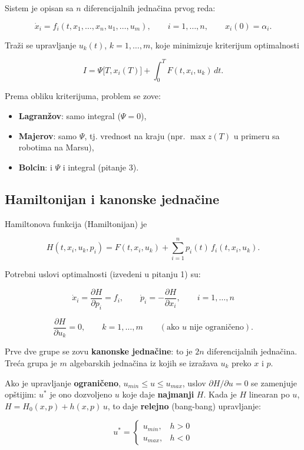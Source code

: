 \documentclass[11pt,a4paper,parskip=half,headsepline,numbers=noenddot]{scrartcl}
\begin{document}
Sistem je opisan sa \(n\) diferencijalnih jednačina prvog reda:

\[\dot x_i = f_i(t, x_1, \dots, x_n, u_1, \dots, u_m), \qquad i = 1, \dots, n, \qquad x_i(0) = \alpha_i .\]

Traži se upravljanje \(u_k(t)\), \(k = 1, \dots, m\), koje minimizuje kriterijum optimalnosti

\[I = \Psi\big[T, x_i(T)\big] + \int_0^T F(t, x_i, u_k)\,dt .\]

Prema obliku kriterijuma, problem se zove:

\begin{itemize}
\item \textbf{Lagranžov}: samo integral (\(\Psi = 0\)),
\item \textbf{Majerov}: samo \(\Psi\), tj. vrednost na kraju (npr. \(\max z(T)\) u primeru sa robotima na Marsu),
\item \textbf{Bolcin}: i \(\Psi\) i integral (pitanje 3).
\end{itemize}

\subsection{Hamiltonijan i kanonske jednačine}

Hamiltonova funkcija (Hamiltonijan) je

\[H(t, x_i, u_k, p_i) = F(t, x_i, u_k) + \sum_{i=1}^{n} p_i(t)\, f_i(t, x_i, u_k) .\]

Potrebni uslovi optimalnosti (izvedeni u pitanju 1) su:

\[\dot x_i = \frac{\partial H}{\partial p_i} = f_i, \qquad \dot p_i = -\frac{\partial H}{\partial x_i}, \qquad i = 1, \dots, n\]

\[\frac{\partial H}{\partial u_k} = 0, \qquad k = 1, \dots, m \qquad (\text{ako } u \text{ nije ograničeno}).\]

Prve dve grupe se zovu \textbf{kanonske jednačine}: to je \(2n\) diferencijalnih jednačina. Treća grupa je \(m\) algebarskih jednačina iz kojih se izražava \(u_k\) preko \(x\) i \(p\).

Ako je upravljanje \textbf{ograničeno}, \(u_{min} \le u \le u_{max}\), uslov \(\partial H/\partial u = 0\) se zamenjuje opštijim: \(u^*\) je ono dozvoljeno \(u\) koje daje \textbf{najmanji} \(H\). Kada je \(H\) linearan po \(u\), \(H = H_0(x, p) + h(x, p)\,u\), to daje \textbf{relejno} (bang-bang) upravljanje:

\[u^* = \begin{cases} u_{min}, & h > 0 \\ u_{max}, & h < 0 \end{cases}\]
\end{document}
